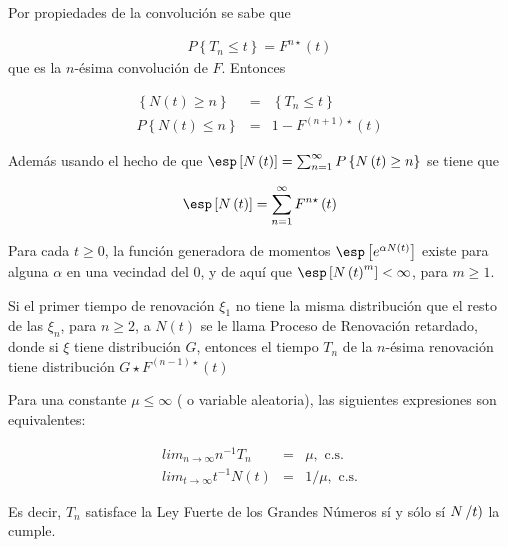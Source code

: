 Por propiedades de la convoluci\'on se sabe que

\begin{eqnarray*}
P\left\{T_{n}\leq t\right\}=F^{n\star}\left(t\right)
\end{eqnarray*}
que es la $n$-\'esima convoluci\'on de $F$. Entonces 

\begin{eqnarray*}
\left\{N\left(t\right)\geq n\right\}&=&\left\{T_{n}\leq t\right\}\\
P\left\{N\left(t\right)\leq n\right\}&=&1-F^{\left(n+1\right)\star}\left(t\right)
\end{eqnarray*}

Adem\'as usando el hecho de que $\esp\left[N\left(t\right)\right]=\sum_{n=1}^{\infty}P\left\{N\left(t\right)\geq n\right\}$
se tiene que

\begin{eqnarray*}
\esp\left[N\left(t\right)\right]=\sum_{n=1}^{\infty}F^{n\star}\left(t\right)
\end{eqnarray*}

\begin{Prop}
Para cada $t\geq0$, la funci\'on generadora de momentos $\esp\left[e^{\alpha N\left(t\right)}\right]$ existe para alguna $\alpha$ en una vecindad del 0, y de aqu\'i que $\esp\left[N\left(t\right)^{m}\right]<\infty$, para $m\geq1$.
\end{Prop}


\begin{Note}
Si el primer tiempo de renovaci\'on $\xi_{1}$ no tiene la misma distribuci\'on que el resto de las $\xi_{n}$, para $n\geq2$, a $N\left(t\right)$ se le llama Proceso de Renovaci\'on retardado, donde si $\xi$ tiene distribuci\'on $G$, entonces el tiempo $T_{n}$ de la $n$-\'esima renovaci\'on tiene distribuci\'on $G\star F^{\left(n-1\right)\star}\left(t\right)$
\end{Note}


\begin{Teo}
Para una constante $\mu\leq\infty$ ( o variable aleatoria), las siguientes expresiones son equivalentes:

\begin{eqnarray}
lim_{n\rightarrow\infty}n^{-1}T_{n}&=&\mu,\textrm{ c.s.}\\
lim_{t\rightarrow\infty}t^{-1}N\left(t\right)&=&1/\mu,\textrm{ c.s.}
\end{eqnarray}
\end{Teo}


Es decir, $T_{n}$ satisface la Ley Fuerte de los Grandes N\'umeros s\'i y s\'olo s\'i $N\left/t\right)$ la cumple.



